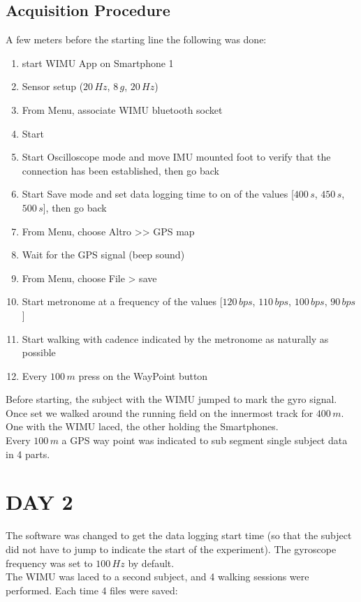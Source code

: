 \documentclass[a4paper,twoside,10pt]{report}
\begin{document}
\subsection{Acquisition Procedure}
A few meters before the starting line the following was done:
\begin{enumerate}
	\item start WIMU App on Smartphone 1
	\item Sensor setup ($20\,Hz$, $8\,g$, $20\,Hz$)
	\item From Menu, associate WIMU bluetooth socket
	\item Start
	\item Start Oscilloscope mode and move IMU mounted foot to verify that the connection has been established, then go back
	\item Start Save mode and set data logging time to on of the values [$400\,s$, $450\,s$, $500\,s$], then go back
	\item From Menu, choose Altro >> GPS map
	\item Wait for the GPS signal (beep sound)
	\item From Menu, choose File > save
	\item Start metronome at a frequency of the values [$120\,bps$, $110\,bps$, $100\,bps$, $90\,bps$]
	\item Start walking with cadence indicated by the metronome as naturally as possible
	\item Every $100\,m$ press on the WayPoint button
\end{enumerate}

Before starting, the subject with the WIMU jumped to mark the gyro signal. 
Once set we walked around the running field on the innermost track for $400\,m$. One with the WIMU laced, the other holding the Smartphones.\\ 
Every $100\,m$ a GPS way point was indicated to sub segment single subject data in 4 parts. 



\section{DAY 2}
The software was changed to get the data logging start time (so that the subject did not have to jump to indicate the start of the experiment). The gyroscope frequency was set to $100\,Hz$ by default.\\
The WIMU was laced to a second subject, and 4 walking sessions were performed. Each time 4 files were saved: 
\end{document}

